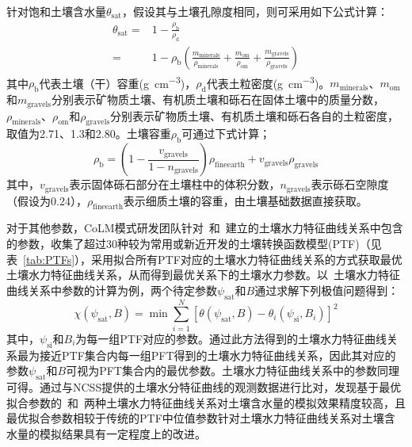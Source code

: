 针对饱和土壤含水量$\theta_{\mathrm {sat}} $，假设其与土壤孔隙度相同，则可采用如下公式计算：
\begin{equation}
  \begin{aligned}
    \theta_{\mathrm {sat}}  =& 1-\frac{\rho_{\mathrm {b}} }{\rho_{\mathrm {d}} }\\
    =& 1-\rho_{\mathrm {b}} \left(\frac{m_{\mathrm{minerals}}}{\rho_{\mathrm{minerals}}}+\frac{m_{\mathrm{om}}}{\rho_{\mathrm{om}}}+\frac{m_{\mathrm{gravels}}}{\rho_{\mathrm{gravels}}}\right)
  \end{aligned}
\end{equation}
其中$\rho_{\mathrm {b}} $代表土壤（干）容重(\unit{g.cm^{-3}})，$\rho_{\mathrm {d}} $代表土粒密度(\unit{g.cm^{-3}})。$m_{\mathrm{minerals}}$、$m_{\mathrm{om}}$和$m_{\mathrm{gravels}}$分别表示矿物质土壤、有机质土壤和砾石在固体土壤中的质量分数，$\rho_{\mathrm{minerals}}$、$\rho_{\mathrm{om}}$和$\rho_{\mathrm{gravels}}$分别表示矿物质土壤、有机质土壤和砾石各自的土粒密度，取值为2.71、1.3和2.80。土壤容重$\rho_{\mathrm {b}} $可通过下式计算；$$\rho_{\mathrm {b}} =\left(1-\frac{v_{\mathrm{gravels}}}{1-n_{\mathrm{gravels}}}\right)\rho_{\mathrm{fineearth}}+v_{\mathrm{gravels}}\rho_{\mathrm{gravels}}$$
其中，$v_{\mathrm{gravels}}$表示固体砾石部分在土壤柱中的体积分数，$n_{\mathrm{gravels}}$表示砾石空隙度（假设为0.24），$\rho_{\mathrm{fineearth}}$表示细质土壤的容重，由土壤基础数据直接获取。

对于其他参数，CoLM模式研发团队针对~\citet{campbell1974}和~\citet{van1980closed}建立的土壤水力特征曲线关系中包含的参数，收集了超过30种较为常用或新近开发的土壤转换函数模型(PTF)（见表~\ref{tab:PTFs}），采用拟合所有PTF对应的土壤水力特征曲线关系的方式获取最优土壤水力特征曲线关系，从而得到最优关系下的土壤水力参数。以~\citet{campbell1974}土壤水力特征曲线关系中参数的计算为例，两个待定参数$\psi_{\mathrm {sat}} $和$B$通过求解下列极值问题得到：$$\chi\left(\psi_{\mathrm {sat}} ,B\right)=\min\sum_{i=1}^N\left[\theta\left(\psi_{\mathrm {sat}} ,B\right)-\theta_i\left(\psi_{\mathrm{si}},B_{i}\right)\right]^2$$
其中，$\psi_{\mathrm{si}}$和$B_{i}$为每一组PTF对应的参数。通过此方法得到的土壤水力特征曲线关系最为接近PTF集合内每一组PFT得到的土壤水力特征曲线关系，因此其对应的参数$\psi_{\mathrm{sat}}$和$B$可视为PFT集合内的最优参数。\citet{van1980closed}土壤水力特征曲线关系中的参数同理可得。\citet{dai2019parameters}通过与NCSS提供的土壤水分特征曲线的观测数据进行比对，发现基于最优拟合参数的~\citet{campbell1974}和~\citet{van1980closed}两种土壤水力特征曲线关系对土壤含水量的模拟效果精度较高，且最优拟合参数相较于传统的PTF中位值参数针对土壤水力特征曲线关系对土壤含水量的模拟结果具有一定程度上的改进。

